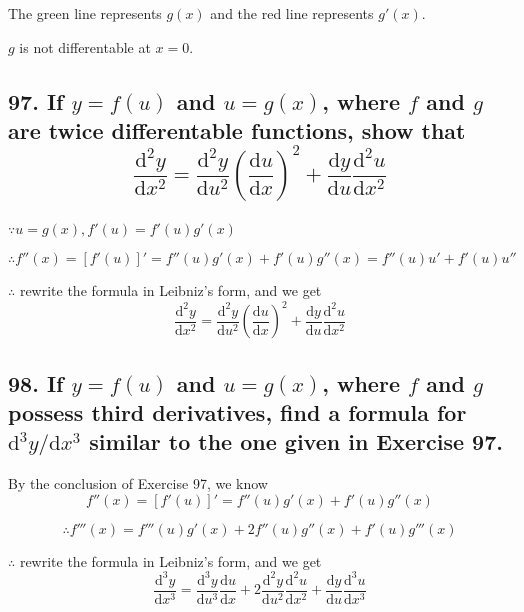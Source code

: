 \documentclass{article}
\begin{document}
    The green line represents $g(x)$ and the red line represents $g'(x)$.

    $g$ is not differentable at $x = 0$.

    \subsection*{97. If $y = f(u)$ and $u = g(x)$, where $f$ and $g$ are twice differentable functions, show that $$\frac{\mathrm d^2y}{\mathrm dx^2} = \frac{\mathrm d^2y}{\mathrm du^2}(\frac{\mathrm du}{\mathrm dx})^2 + \frac{\mathrm dy}{\mathrm du} \frac{\mathrm d^2u}{\mathrm dx^2}$$}
    
    $\because u = g(x), f'(u) = f'(u) g'(x)$

    $$\therefore f''(x) = [f'(u)]' = f''(u)g'(x) + f'(u)g''(x) = f''(u)u' + f'(u)u''$$

    $\therefore$ rewrite the formula in Leibniz's form, and we get
    $$\frac{\mathrm d^2y}{\mathrm dx^2} = \frac{\mathrm d^2y}{\mathrm du^2}(\frac{\mathrm du}{\mathrm dx})^2 + \frac{\mathrm dy}{\mathrm du} \frac{\mathrm d^2u}{\mathrm dx^2}$$

    \subsection*{98. If $y = f(u)$ and $u = g(x)$, where $f$ and $g$ possess third derivatives, find a formula for $\mathrm d^3y / \mathrm dx^3$ similar to the one given in Exercise 97.}

    By the conclusion of Exercise 97, we know $$f''(x) = [f'(u)]' = f''(u)g'(x) + f'(u)g''(x)$$

    $$\therefore f'''(x) = f'''(u)g'(x) + 2f''(u)g''(x) + f'(u)g'''(x)$$

    $\therefore$ rewrite the formula in Leibniz's form, and we get
    $$\frac{\mathrm d^3y}{\mathrm dx^3} = \frac{\mathrm d^3y}{\mathrm du^3} \frac{\mathrm du}{\mathrm dx} + 2 \frac{\mathrm d^2y}{\mathrm du^2}\frac{\mathrm d^2u}{\mathrm dx^2} + \frac{\mathrm dy}{\mathrm du} \frac{\mathrm d^3u}{\mathrm dx^3}$$
\end{document}

